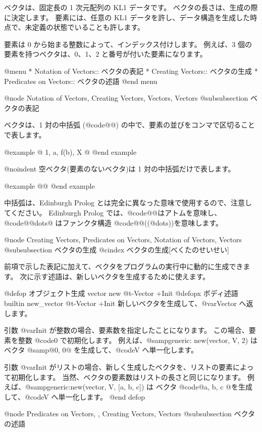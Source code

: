 {{ベクタは、固定長の 1 次元配列の KL1 データです。
ベクタの長さは、生成の際に決定します。
要素には、任意の KL1 データを許し、データ構造を生成した時点で、未定義の状態でいることも許します。

要素は 0 から始まる整数によって、インデックス付けします。
例えば、3 個の要素を持つベクタは、0、1、2 と番号が付いた要素になります。

@menu
* Notation of Vectors::         ベクタの表記
* Creating Vectors::            ベクタの生成
* Predicates on Vectors::       ベクタの述語
@end menu

@node Notation of Vectors, Creating Vectors, Vectors, Vectors
@subsubsection ベクタの表記

ベクタは、1 対の中括弧 (@code{@{@}}) の中で、要素の並びをコンマで区切ることで表します。

@example
@{ 1, a, f(b), X @}
@end example

@noindent
空ベクタ(要素のないベクタ)は 1 対の中括弧だけで表します。

@example
@{@}
@end example

中括弧は、Edinburgh Prolog とは完全に異なった意味で使用するので、注意してください。
Edinburgh Prolog では、@code{@{@}}はアトムを意味し、@code{@{@dots{}@}} はファンクタ構造 @code{@{@}((@dots{}))}を意味します。

@node Creating Vectors, Predicates on Vectors, Notation of Vectors, Vectors
@subsubsection ベクタの生成
@cindex ベクタの生成[べくたのせいせい]

前項で示した表記に加えて、ベクタをプログラムの実行中に動的に生成できます。
次に示す述語は、新しいベクタを生成するために使えます。

@defop {オブジェクト生成} {vector} new @t{-}Vector +Init
@defopx {ボディ述語} {builtin} new_vector @t{-}Vector +Init
新しいベクタを生成して、@var{Vector} へ返します。

引数 @var{Init} が整数の場合、要素数を指定したことになります。
この場合、要素を整数 @code{0} で初期化します。
例えば、@samp{generic: new(vector, V, 2)} はベクタ @samp{@{0, 0@}} を生成して、@code{V} へ単一化します。

引数 @var{Init} がリストの場合、新しく生成したベクタを、リストの要素によって初期化します。
当然、ベクタの要素数はリストの長さと同じになります。
例えば、@samp{generic:new(vector, V, [a, b, c])} は ベクタ @code{@{a, b, c @}}を生成して、@code{V} へ単一化します。
@end defop 

@node Predicates on Vectors,  , Creating Vectors, Vectors
@subsubsection ベクタの述語

}}
